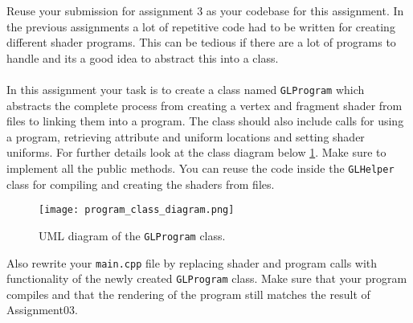 \documentclass[12pt, a4paper, oneside, ngerman]{article}
\begin{document}




Reuse your submission for assignment 3 as your codebase for this assignment.
In the previous assignments a lot of repetitive code had to be written for creating different shader programs. This can be tedious if there are a lot of programs to handle and its a good idea to abstract this into a class.
\\
\\
In this assignment your task is to create a class named \texttt{GLProgram} which abstracts the complete process from creating a vertex and fragment shader from files to linking them into a program. The class should also include calls for using a program, retrieving attribute and uniform locations and setting shader uniforms. For further details look at the class diagram below \ref{fig:class_diagram}. Make sure to implement all the public methods. You can reuse the code inside the \texttt{GLHelper} class for compiling and creating the shaders from files.


\begin{figure}
  \centering
  \texttt{[image: program\_class\_diagram.png]}
  \caption{UML diagram of the \texttt{GLProgram} class.}
  \label{fig:class_diagram}
\end{figure}

Also rewrite your \texttt{main.cpp} file by replacing shader and program calls with functionality of the newly created \texttt{GLProgram} class. Make sure that your program compiles and that the rendering of the program still matches the result of Assignment03.
\end{document}
